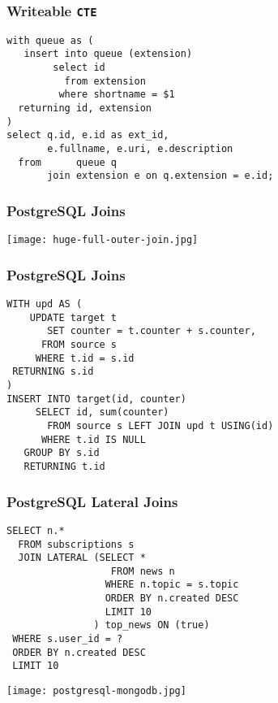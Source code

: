 \documentclass{beamer}
\begin{document}
\begin{frame}[fragile]
  \frametitle{Writeable \texttt{CTE}}
  
  \begin{verbatim}
with queue as (
   insert into queue (extension)
        select id
          from extension
         where shortname = $1
  returning id, extension
)
select q.id, e.id as ext_id,
       e.fullname, e.uri, e.description
  from      queue q
       join extension e on q.extension = e.id;    
  \end{verbatim}
\end{frame}

\begin{frame}
  \frametitle{PostgreSQL Joins}

  \begin{center}
    \texttt{[image: huge-full-outer-join.jpg]}
  \end{center}
\end{frame}

\begin{frame}[fragile]
  \frametitle{PostgreSQL Joins}

  \begin{verbatim}
WITH upd AS (
    UPDATE target t
       SET counter = t.counter + s.counter,
      FROM source s
     WHERE t.id = s.id
 RETURNING s.id
)
INSERT INTO target(id, counter)
     SELECT id, sum(counter)
       FROM source s LEFT JOIN upd t USING(id)
      WHERE t.id IS NULL
   GROUP BY s.id
   RETURNING t.id
  \end{verbatim}
\end{frame}

\begin{frame}[fragile]
  \frametitle{PostgreSQL Lateral Joins}

  \vfill
  
  \begin{verbatim}
SELECT n.*
  FROM subscriptions s
  JOIN LATERAL (SELECT *
                  FROM news n
                 WHERE n.topic = s.topic
                 ORDER BY n.created DESC
                 LIMIT 10
               ) top_news ON (true)
 WHERE s.user_id = ?
 ORDER BY n.created DESC
 LIMIT 10
  \end{verbatim}
\end{frame}
 
\begin{frame}
  \begin{center}
    \texttt{[image: postgresql-mongodb.jpg]}
  \end{center}
\end{frame}
\end{document}
